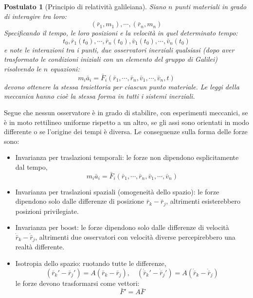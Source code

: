 \documentclass[11pt, a4paper, openright]{book}
\theoremstyle{plain}
\newtheorem{postulato}[teorema]{Postulato}
\theoremstyle{definition}
\theoremstyle{remark}
\begin{document}
\begin{postulato}[Principio di relatività galileiana]
    Siano $n$ punti materiali in grado di interagire tra loro:
    \begin{equation}
        (\bar{r}_1, m_1), \cdots, (\bar{r}_n, m_n)
    \end{equation}
    Specificando il tempo, le loro posizioni e la velocità in quel determinato tempo:
    \begin{equation}
        t_0, \bar{r}_1(t_0), \cdots, \bar{r}_n(t_0), \bar{v}_1(t_0), \cdots, \bar{v}_n(t_0)
    \end{equation}
    e note le interazioni tra i punti, due osservatori inerziali qualsiasi (dopo aver trasformato le condizioni iniziali con un elemento del gruppo di Galilei) risolvendo le $n$ equazioni:
    \begin{equation}
        m_i\bar{a}_i = \bar{F}_i(\bar{r}_1, \cdots, \bar{r}_n, \bar{v}_1, \cdots, \bar{v}_n, t)
    \end{equation}
    devono ottenere la stessa traiettoria per ciascun punto materiale. Le leggi della meccanica hanno cioè la stessa forma in tutti i sistemi inerziali.
\end{postulato}

Segue che nessun osservatore è in grado di stabilire, con esperimenti meccanici, se è in moto rettilineo uniforme rispetto a un altro, se gli assi sono orientati in modo differente o se l'origine dei tempi è diversa. Le conseguenze sulla forma delle forze sono:
\begin{itemize}
    \item Invarianza per traslazioni temporali: le forze non dipendono esplicitamente dal tempo,
    \begin{equation}
        m_i\bar{a}_i = \bar{F}_i(\bar{r}_1, \cdots, \bar{r}_n, \bar{v}_1, \cdots, \bar{v}_n)
    \end{equation}
    \item Invarianza per traslazioni spaziali (omogeneità dello spazio): le forze dipendono solo dalle differenze di posizione $\bar{r}_k - \bar{r}_j$, altrimenti esisterebbero posizioni privilegiate.
    \item Invarianza per boost: le forze dipendono solo dalle differenze di velocità $\dot{\bar{r}}_k - \dot{\bar{r}}_j$, altrimenti due osservatori con velocità diverse percepirebbero una realtà differente.
    \item Isotropia dello spazio: ruotando tutte le differenze,
    \begin{equation}
        (\bar{r}_k' - \bar{r}_j') = A(\bar{r}_k - \bar{r}_j), \quad (\dot{\bar{r}}_k' - \dot{\bar{r}}_j') = A(\dot{\bar{r}}_k - \dot{\bar{r}}_j)
    \end{equation}
    le forze devono trasformarsi come vettori:
    \begin{equation}
        \bar{F}' = A \bar{F}
    \end{equation}
\end{itemize}
\end{document}
